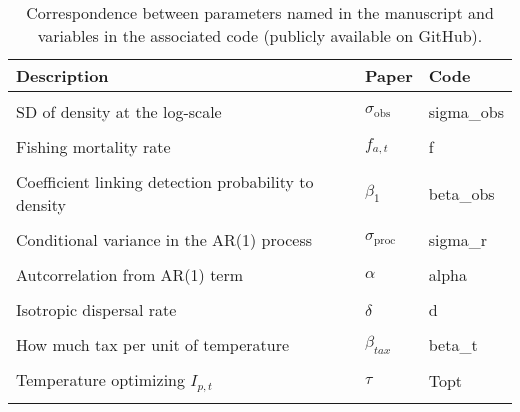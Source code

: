 \documentclass[
  portrait]{article}
\author{}
\date{\vspace{-2.5em}}
\begin{document}
\begin{table}
\centering
\caption{\label{tab:tbl-pars-stan}Correspondence between parameters named in the manuscript and variables in the associated code (publicly available on GitHub).}
\centering
\fontsize{8}{10}\selectfont
\begin{tabu} to 
\toprule
Description & Paper & Code\\
\midrule
{} &  & \\
SD of density at the log-scale & $\sigma_{\mathrm{obs}}$ & sigma_obs\\
 &  & \\
Fishing mortality rate & $f_{a, t}$ & f\\
 &  & \\
\addlinespace
Coefficient linking detection probability to density & $\beta_1$ & beta_obs\\
 &  & \\
Conditional variance in the AR(1) process & $\sigma_{\mathrm{proc}}$ & sigma_r\\
 &  & \\
Autcorrelation from AR(1) term & $\alpha$ & alpha\\
\addlinespace
{} &  & \\
Isotropic dispersal rate & $\delta$ & d\\
 &  & \\
How much tax per unit of temperature & $\beta_{tax}$ & beta_t\\
 &  & \\
\addlinespace
Temperature optimizing $I_{p, t}$ & $\tau$ & Topt\\
 &  & \\
\bottomrule
\end{tabu}
\end{table}
\end{document}
